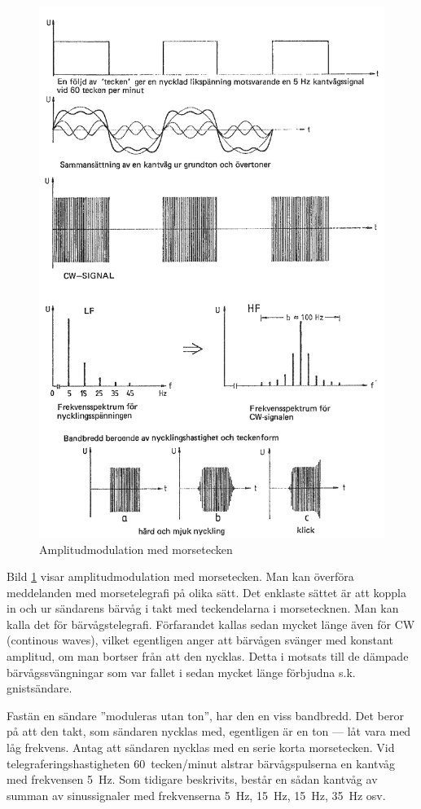 \begin{figure}
	\includegraphics[width=.9\textwidth]{images/cropped_pdfs/bild_2_1-26.pdf}
	\caption{Amplitudmodulation med morsetecken}
	\label{fig:BildII1-26}
\end{figure}

Bild \ref{fig:BildII1-26} visar amplitudmodulation med morsetecken.
Man kan överföra meddelanden med morsetelegrafi på olika sätt.
Det enklaste sättet är att koppla in och ur sändarens bärvåg i takt med
teckendelarna i morsetecknen.
Man kan kalla det för bärvågstelegrafi.
Förfarandet kallas sedan mycket länge även för CW (continous waves), vilket
egentligen anger att bärvågen svänger med konstant amplitud, om man bortser
från att den nycklas.
Detta i motsats till de dämpade bärvågssvängningar som var fallet i sedan
mycket länge förbjudna s.k. gnistsändare.

Fastän en sändare ''moduleras utan ton'', har den en viss bandbredd.
Det beror på att den takt, som sändaren nycklas med, egentligen är en ton ---
låt vara med låg frekvens.
Antag att sändaren nycklas med en serie korta morsetecken.
Vid telegraferingshastigheten 60~tecken/minut alstrar bärvågspulserna en kantvåg
med frekvensen \SI{5}{Hz}.
Som tidigare beskrivits, består en sådan kantvåg av summan av sinussignaler med
frekvenserna \SI{5}{Hz}, \SI{15}{Hz}, \SI{15}{Hz}, \SI{35}{Hz} osv.

